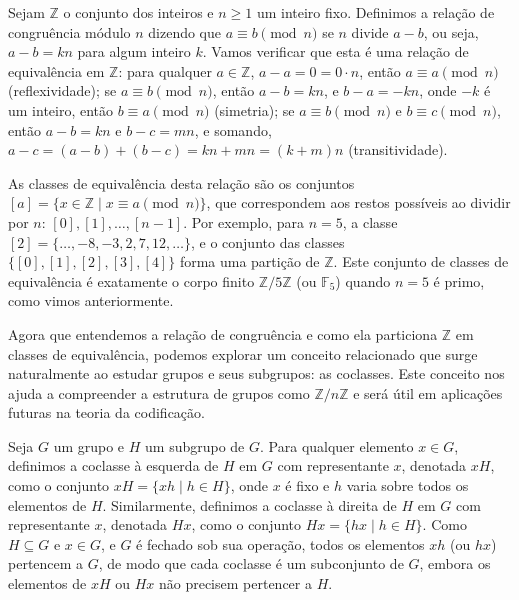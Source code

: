 \begin{example}
Sejam $\mathbb{Z}$ o conjunto dos inteiros e $n \geq 1$ um inteiro fixo.
Definimos a relação de congruência módulo $n$ dizendo que $a \equiv b \pmod{n}$ se $n$
divide $a - b$, ou seja, $a - b = k n$ para algum inteiro $k$.
Vamos verificar que esta é uma relação de equivalência em $\mathbb{Z}$:
para qualquer $a \in \mathbb{Z}$, $a - a = 0 = 0 \cdot n$, então $a \equiv a \pmod{n}$ (reflexividade);
se $a \equiv b \pmod{n}$, então $a - b = k n$, e $b - a = -k n$, onde $-k$ é um inteiro, então $b \equiv a \pmod{n}$ (simetria);
se $a \equiv b \pmod{n}$ e $b \equiv c \pmod{n}$, então $a - b = k n$ e $b - c = m n$, e somando, $a - c = (a - b) + (b - c) = k n + m n = (k + m) n$ (transitividade).

As classes de equivalência desta relação são os conjuntos $[a] = \{ x \in \mathbb{Z} \mid x \equiv a \pmod{n} \}$,
que correspondem aos restos possíveis ao dividir por $n$: $[0], [1], \ldots, [n-1]$.
Por exemplo, para $n = 5$, a classe $[2] = \{ \ldots, -8, -3, 2, 7, 12, \ldots \}$,
e o conjunto das classes $\{ [0], [1], [2], [3], [4] \}$ forma uma partição de $\mathbb{Z}$.
Este conjunto de classes de equivalência é exatamente o corpo finito $\mathbb{Z}/5\mathbb{Z}$
(ou $\mathbb{F}_5$) quando $n = 5$ é primo, como vimos anteriormente.
\end{example}










Agora que entendemos a relação de congruência e como ela particiona
$\mathbb{Z}$ em classes de equivalência, podemos explorar um conceito
relacionado que surge naturalmente ao estudar grupos e seus subgrupos: as
coclasses. Este conceito nos ajuda a compreender a estrutura de grupos como
$\mathbb{Z}/n\mathbb{Z}$ e será útil em aplicações futuras na teoria da
codificação.

\begin{definition}[Coclasse]
Seja $G$ um grupo e $H$ um subgrupo de $G$. Para qualquer elemento $x \in G$,
definimos a coclasse à esquerda de $H$ em $G$ com
representante $x$, denotada $xH$, como o conjunto $xH = \{ xh \mid h \in H \}$,
onde $x$ é fixo e $h$ varia sobre todos os elementos
de $H$. Similarmente, definimos a coclasse à direita de $H$ em
$G$ com representante $x$, denotada $Hx$, como o conjunto
$Hx = \{ hx \mid h \in H \}$. Como $H \subseteq G$ e $x \in G$, e $G$
é fechado sob sua operação, todos os elementos $xh$ (ou $hx$)
pertencem a $G$, de modo que cada coclasse é um subconjunto de $G$,
embora os elementos de $xH$ ou $Hx$ não precisem pertencer a $H$.
\end{definition}

